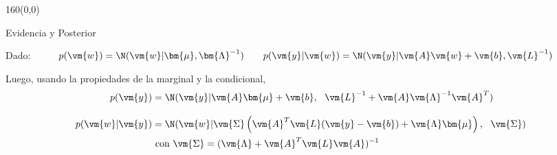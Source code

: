 \documentclass[shownotes,aspectratio=169]{beamer}
\begin{document}
\begin{frame}[plain]
 \begin{textblock}{160}(0,0)
\begin{center}
 \Large Evidencia y Posterior \\
\end{center}
\end{textblock}
\vspace{1cm}

Dado: \ \ \ \ \ $ p(\vm{w}) =  \N(\vm{w}|\bm{\mu},\bm{\Lambda}^{-1}) \ \ \ \ \ \
   p(\vm{y}|\vm{w}) =  \N(\vm{y}|\vm{A}\vm{w}+\vm{b},\vm{L}^{-1})    $
   \vspace{0.25cm}
   
\vspace{1cm}

Luego, usando la propiedades de la marginal y la condicional,
\pause
\begin{align*}
 p(\vm{y}) &= \N(\vm{y}| \vm{A}\bm{\mu} + \vm{b} , \ \   \vm{L}^{-1} + \vm{A}\vm{\Lambda}^{-1}\vm{A}^T ) \\[0.3cm]
 p(\vm{w}|\vm{y}) &= \N(\vm{w} | \vm{\Sigma}\left( \vm{A}^T \vm{L} (\vm{y}-\vm{b}) + \vm{\Lambda} \bm{\mu}  \right), \ \ \vm{\Sigma}) \\ 
 &  \text{ con } \vm{\Sigma} = (\vm{\Lambda} + \vm{A}^T \vm{L}\vm{A})^{-1}
\end{align*}

\end{frame}
 
\end{document}
